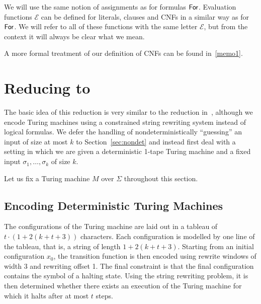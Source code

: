 \documentclass[a4paper,UKenglish,cleveref, autoref]{lipics-v2019}
\begin{document}
We will use the same notion of assignments as for formulas $\textsf{For}$. 
Evaluation functions $\mathcal{E}$ can be defined for literals, clauses and CNFs in a similar way as for $\textsf{For}$. We will refer to all of these functions with the same letter $\mathcal{E}$, but from the context it will always be clear what we mean.

A more formal treatment of our definition of CNFs can be found in~\ref{memo1}.


\section{Reducing \gennp{} to \strconrew{}}
The basic idea of this reduction is very similar to the reduction in~\cite{Sipser:TheoryofComputation}, although we encode Turing machines using a constrained string rewriting system instead of logical formulas. We defer the handling of nondeterministically ``guessing'' an input of size at most $k$ to Section~\ref{sec:nondet} and instead first deal with a setting in which we are given a deterministic 1-tape Turing machine and a fixed input $\sigma_1, \ldots, \sigma_k$ of size $k$. 

Let us fix a Turing machine $M$ over $\Sigma$ throughout this section. 

\subsection{Encoding Deterministic Turing Machines}
The configurations of the Turing machine are laid out in a tableau of $t \cdot (1 + 2(k + t + 3))$ characters. Each configuration is modelled by one line of the tableau, that is, a string of length $1 + 2(k + t + 3)$. Starting from an initial configuration $x_0$, the transition function is then encoded using rewrite windows of width 3 and rewriting offset 1. The final constraint is that the final configuration contains the symbol of a halting state. 
Using the string rewriting problem, it is then determined whether there exists an execution of the Turing machine for which it halts after at most $t$ steps. 
\end{document}
